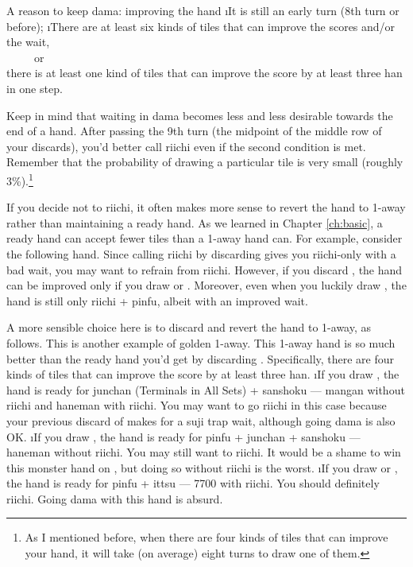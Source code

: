 \bigskip
\begin{itembox}[c]{A reason to keep {\jap dama}: improving the hand}
\bi
\i It is still an early turn (8th turn or before);
\i There are at least six kinds of tiles that can improve the scores and/or the wait, \\~~~~~or\\
there is at least one kind of tiles that can improve the score by at least three {\jap han} in one step.
\ei
\end{itembox}

\bigskip
Keep in mind that waiting in {\jap dama} becomes less and less desirable towards the end of a hand. After passing the 9th turn (the midpoint of the middle row of your discards), you'd better call riichi even if the second condition is met. Remember that the probability of drawing a particular tile is very small (roughly 3\%).\footnote{As I mentioned before, when there are four kinds of tiles that can improve your hand, it will take (on average) eight turns to draw one of them.}

\bigskip
If you decide not to riichi, it often makes more sense to revert the hand to 1-away rather than maintaining a ready hand. As we learned in Chapter \ref{ch:basic}, a ready hand can accept fewer tiles than a 1-away hand can. For example, consider the following hand.
\bp
{}%
\ep
Since calling riichi by discarding {\LARGE {}} gives you riichi-only with a bad wait, you may want to refrain from riichi. However, if you discard {\LARGE {}}, the hand can be improved only if you draw {\LARGE {}} or {\LARGE {}}. Moreover, even when you luckily draw {\LARGE {}}, the hand is still only riichi + {\jap pinfu}, albeit with an improved wait.

\bigskip
A more sensible choice here is to discard {\LARGE {}} and revert the hand to 1-away, as follows.
\bp
{}%
\ep
This is another example of golden 1-away. 
This 1-away hand is so much better than the ready hand you'd get by discarding {\LARGE {}}. Specifically, there are four kinds of tiles that can improve the score by at least three {\jap han}.
\bi {}
\i If you draw {\LARGE{}}, the hand is ready for {\jap junchan} (Terminals in All Sets) + {\jap sanshoku} --- {\jap mangan} without riichi and {\jap haneman} with riichi. You may want to go riichi in this case because your previous discard of {\LARGE {}} makes for a {\jap suji} trap wait, although going {\jap dama} is also OK. 
\i If you draw {\LARGE{}}, the hand is ready for {\jap pinfu + junchan + sanshoku} --- {\jap haneman} without riichi. You may still want to riichi. It would be a shame to win this monster hand on {\LARGE{}}, but doing so without riichi is the worst.
\i If you draw {\LARGE{}} or {\LARGE{}}, the hand is ready for {\jap pinfu + ittsu} --- 7700 with riichi. You should definitely riichi. Going {\jap dama} with this hand is absurd.
\ei


